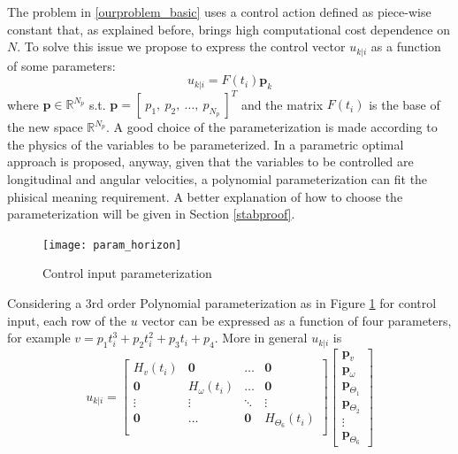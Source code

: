 The problem in \ref{ourproblem_basic} uses a control action defined as piece-wise constant that, as explained before, brings high computational cost dependence on $N$. To solve this issue we propose to express the control vector ${u}_{k|i}$ as a function of some parameters:
\begin{equation}\label{param_eq}
{u}_{k|i}=F(t_i)\textbf{p}_k
\end{equation}
where $\textbf{p} \in \mathbb{R}^{N_p}$ s.t. $\textbf{p}=[\ p_1,\ p_2,\ \dots,\ p_{N_p}\ ]^T$ and the matrix $F(t_i)$ is the base of the new space $\mathbb{R}^{N_p}$. A good choice of the parameterization is made according to the physics of the variables to be parameterized. In \cite{kelly2013mobile} a parametric optimal approach is proposed, anyway, given that the variables to be controlled are longitudinal and angular velocities, a polynomial parameterization can fit the phisical meaning requirement. A better explanation of how to choose the parameterization will be given in Section \ref{stabproof}.
\begin{figure}[h!]
	\centering
	\texttt{[image: param\_horizon]}
	\caption{Control input parameterization}
	\label{param_horizon}
\end{figure}
Considering a 3rd order Polynomial parameterization as in Figure \ref{param_horizon} for control input, each row of the ${u}$ vector can be expressed as a function of four parameters, for example $v=p_1t_i^3+p_2t_i^2+p_3t_i+p_4$. More in general ${u}_{k|i}$ is
\begin{equation}
{u}_{k|i}=\left[ \begin{matrix}
H_v(t_i)          & \textbf{0} & \dots      & \textbf{0}  \\
\textbf{0} &     H_\omega(t_i)      & \dots      & \textbf{0}  \\
\vdots     & \vdots     & \ddots     & \vdots      \\
\textbf{0} & \dots      & \textbf{0} &   H_{\Theta_6}(t_i)         \\
\end{matrix} \right] \left[ \begin{matrix} \textbf{p}_v \\ \textbf{p}_{\omega} \\ \textbf{p}_{\Theta_1} \\ \textbf{p}_{\Theta_2} \\ \vdots \\ \textbf{p}_{\Theta_6} \end{matrix} \right]
\end{equation}
